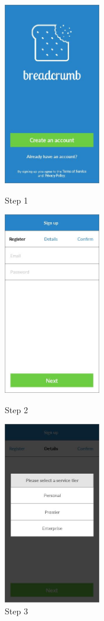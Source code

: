 \begin{figure}
  \subfigures
  \centering
  \begin{minipage}{4.6cm}
    \centering
    \includegraphics[width=4.2cm]{inc/ui_reg_step1.jpg}
    \caption{Step 1}
    \label{fig:ui_reg_step1}
  \end{minipage}
  \begin{minipage}{4.6cm}
    \centering
    \includegraphics[width=4.2cm]{inc/ui_reg_step2.jpg}
    \caption{Step 2}
    \label{fig:ui_reg_step2}
  \end{minipage}
  \begin{minipage}{4.6cm}
    \centering
    \includegraphics[width=4.2cm]{inc/ui_reg_step3.jpg}
    \caption{Step 3}
    \label{fig:ui_reg_step3}
  \end{minipage}
\end{figure}

